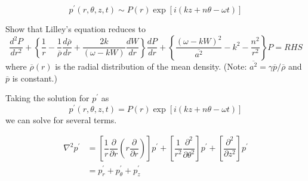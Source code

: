 \documentclass[onecolumn,10pt]{jhwhw}
\begin{document}
$$
p^{\prime} (r,\theta,z,t) \sim P(r) \exp[i(kz+n \theta - \omega t)]
$$

Show that Lilley’s equation reduces to
$$
\dfrac{d^2 P}{dr^2} + \left \{ \dfrac{1}{r} - \dfrac{1}{\overline{\rho}} \dfrac{d \overline{\rho}}{dr} + \dfrac{2k}{(\omega-kW)}  \dfrac{dW}{dr} \right \} \dfrac{dP}{dr} + \left \{ \dfrac{(\omega-kW)^2}{\overline{a^2}} -k^2-\dfrac{n^2}{r^2} \right \} P = RHS
$$
where $\overline{\rho}(r)$ is the radial distribution of the mean density. (Note: $\overline{a^2} = \gamma \overline{p}/\overline{\rho}$ and $\overline{p}$ is constant.)

\solution
Taking the solution for $p^{\prime}$ as
$$
p^{\prime} (r,\theta,z,t) = P(r) \exp[i(kz+n \theta - \omega t)]
$$
we can solve for several terms.


\begin{align*}
\nabla^2 p^{\prime} &= \left [ \dfrac{1}{r} \dfrac{\partial}{\partial r} \left ( r \dfrac{\partial} {\partial r} \right ) \right ] p^{\prime}
+ \left [ \dfrac{1}{r^2} \dfrac{\partial ^2}{\partial \theta^2} \right ] p^{\prime}
+ \left [ \dfrac{\partial ^2}{\partial z^2} \right ] p^{\prime} \\
&= p^{\prime}_r + p^{\prime}_{\theta} + p^{\prime}_z
\end{align*}
\end{document}
